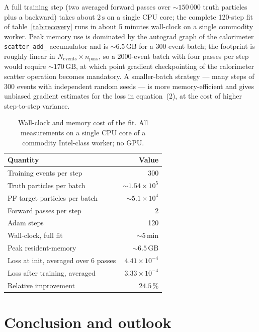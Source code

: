 \documentclass[a4paper,11pt]{article}
\begin{document}
A full training step (two averaged forward passes over $\sim\!150\,000$
truth particles plus a backward) takes about $2\,\mathrm{s}$ on a
single CPU core; the complete 120-step fit of table~\ref{tab:recovery}
runs in about 5 minutes wall-clock on a single commodity worker. Peak
memory use is dominated by the autograd graph of the calorimeter
\texttt{scatter\_add\_} accumulator and is $\sim\!6.5\,\mathrm{GB}$ for
a 300-event batch; the footprint is roughly linear in
$N_\mathrm{events}\times n_\mathrm{pass}$, so a 2000-event batch with
four passes per step would require $\sim\!170\,\mathrm{GB}$, at which
point gradient checkpointing of the calorimeter scatter operation
becomes mandatory. A smaller-batch strategy --- many steps of 300
events with independent random seeds --- is more memory-efficient and
gives unbiased gradient estimates for the loss in equation~(2), at the
cost of higher step-to-step variance.

\begin{table}[tbp]
\centering
\caption{Wall-clock and memory cost of the fit. All measurements on
a single CPU core of a commodity Intel-class worker; no GPU.}
\label{tab:numerics}
\small
\begin{tabular}{lr}
\toprule
Quantity & Value \\
\midrule
Training events per step       & 300 \\
Truth particles per batch      & $\sim\!1.54\times10^5$ \\
PF target particles per batch  & $\sim\!5.1\times10^4$ \\
Forward passes per step        & 2 \\
Adam steps                     & 120 \\
Wall-clock, full fit           & $\sim\!5\,\mathrm{min}$ \\
Peak resident-memory           & $\sim\!6.5\,\mathrm{GB}$ \\
Loss at init, averaged over 6 passes   & $4.41\times10^{-4}$ \\
Loss after training, averaged          & $3.33\times10^{-4}$ \\
Relative improvement                   & $24.5\,\%$ \\
\bottomrule
\end{tabular}
\end{table}

\section{Conclusion and outlook}
\label{sec:conclusion}
\end{document}
